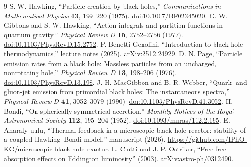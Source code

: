 \documentclass[11pt,a4paper]{article}
\begin{document}
\begin{thebibliography}{9}
 S. W. Hawking, ``Particle creation by black holes,'' \emph{Communications in Mathematical Physics} \textbf{43}, 199--220 (1975). \href{https://doi.org/10.1007/BF02345020}{doi:10.1007/BF02345020}.
 G. W. Gibbons and S. W. Hawking, ``Action integrals and partition functions in quantum gravity,'' \emph{Physical Review D} \textbf{15}, 2752--2756 (1977). \href{https://doi.org/10.1103/PhysRevD.15.2752}{doi:10.1103/PhysRevD.15.2752}.
 P. Benetti Genolini, ``Introduction to black hole thermodynamics,'' lecture notes (2025). \href{https://arxiv.org/abs/2512.24929}{arXiv:2512.24929}.
 D. N. Page, ``Particle emission rates from a black hole: Massless particles from an uncharged, nonrotating hole,'' \emph{Physical Review D} \textbf{13}, 198--206 (1976). \href{https://doi.org/10.1103/PhysRevD.13.198}{doi:10.1103/PhysRevD.13.198}.
 J. H. MacGibbon and B. R. Webber, ``Quark- and gluon-jet emission from primordial black holes: The instantaneous spectra,'' \emph{Physical Review D} \textbf{41}, 3052--3079 (1990). \href{https://doi.org/10.1103/PhysRevD.41.3052}{doi:10.1103/PhysRevD.41.3052}.
 H. Bondi, ``On spherically symmetrical accretion,'' \emph{Monthly Notices of the Royal Astronomical Society} \textbf{112}, 195--204 (1952). \href{https://doi.org/10.1093/mnras/112.2.195}{doi:10.1093/mnras/112.2.195}.
 E. Anaraly uulu, ``Thermal feedback in a microscopic black hole reactor: stability of a coupled Hawking--Bondi model,'' manuscript (2026). \url{https://github.com/IPhO-KG/microscopic-black-hole-reactor}.
 L. Ciotti and J. P. Ostriker, ``Free-free absorption effects on Eddington luminosity'' (2003). \href{https://arxiv.org/abs/astro-ph/0312490}{arXiv:astro-ph/0312490}.
\end{thebibliography}
\end{document}
